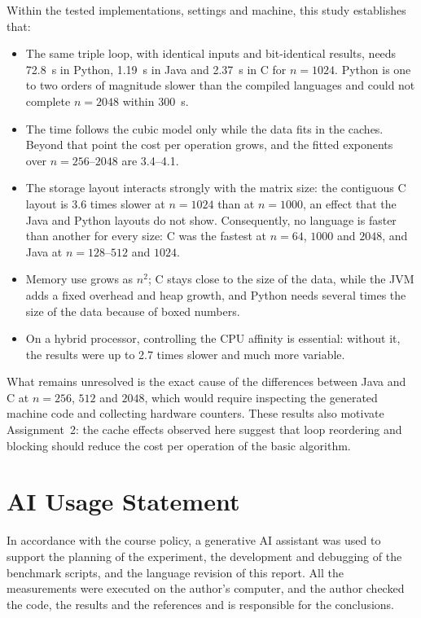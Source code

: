 \documentclass[12pt,a4paper]{report}
\begin{document}
Within the tested implementations, settings and machine, this study establishes that:
\begin{itemize}
  \item The same triple loop, with identical inputs and bit-identical results, needs 72.8~s in Python, 1.19~s in Java
  and 2.37~s in C for $n = 1024$. Python is one to two orders of magnitude slower than the compiled languages and could
  not complete $n = 2048$ within 300~s.
  \item The time follows the cubic model only while the data fits in the caches. Beyond that point the cost per
  operation grows, and the fitted exponents over $n = 256$--$2048$ are 3.4--4.1.
  \item The storage layout interacts strongly with the matrix size: the contiguous C layout is 3.6 times slower at
  $n = 1024$ than at $n = 1000$, an effect that the Java and Python layouts do not show. Consequently, no language is
  faster than another for every size: C was the fastest at $n = 64$, $1000$ and $2048$, and Java at $n = 128$--$512$
  and $1024$.
  \item Memory use grows as $n^2$; C stays close to the size of the data, while the JVM adds a fixed overhead and
  heap growth, and Python needs several times the size of the data because of boxed numbers.
  \item On a hybrid processor, controlling the CPU affinity is essential: without it, the results were up to 2.7 times
  slower and much more variable.
\end{itemize}

What remains unresolved is the exact cause of the differences between Java and C at $n = 256$, $512$ and $2048$, which
would require inspecting the generated machine code and collecting hardware counters. These results also motivate
Assignment~2: the cache effects observed here suggest that loop reordering and blocking should reduce the cost per
operation of the basic algorithm.

\chapter*{AI Usage Statement}

In accordance with the course policy, a generative AI assistant was used to support the planning of the experiment,
the development and debugging of the benchmark scripts, and the language revision of this report. All the
measurements were executed on the author's computer, and the author checked the code, the results and the references
and is responsible for the conclusions.
\end{document}
